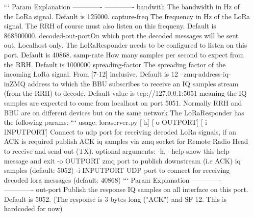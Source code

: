 {}``` \markdownRendererPipe{} Param \markdownRendererPipe{} Explanation \markdownRendererPipe{} \markdownRendererPipe{} ------------- \markdownRendererPipe{} ------------- \markdownRendererPipe{} \markdownRendererPipe{} bandwith \markdownRendererPipe{} The bandwidth in Hz of the LoRa signal. Default is 125000. \markdownRendererPipe{} \markdownRendererPipe{} capture-freq \markdownRendererPipe{} The frequency in Hz of the LoRa signal. The RRH of course must also listen on this frequeny. Default is 868500000. \markdownRendererPipe{} \markdownRendererPipe{}decoded-out-port\markdownRendererPipe{}On which port the decoded messages will be sent out. Localhost only. The LoRa\markdownRendererUnderscore{}Responder needs to be configured to listen on this port. Default is 40868.\markdownRendererPipe{} \markdownRendererPipe{}samp-rate\markdownRendererPipe{} How many samples per second to expect from the RRH. Default is 1000000\markdownRendererPipe{} \markdownRendererPipe{}spreading-factor\markdownRendererPipe{} The spreading factor of the incoming LoRa signal. From [7-12] inclusive. Default is 12 \markdownRendererPipe{} \markdownRendererPipe{}--zmq-address-iq-in\markdownRendererPipe{}ZMQ address to which the BBU subscribes to receive an IQ samples stream (from the RRH) to decode. Default value is tcp://127.0.0.1:5051 meaning the IQ samples are expected to come from localhost on port 5051. Normally RRH and BBU are on different devices but on the same network\markdownRendererPipe{}\markdownRendererInterblockSeparator
{}\markdownRendererHorizontalRule{}\markdownRendererInterblockSeparator
{}The LoRa\markdownRendererUnderscore{}Responder has the following params:\markdownRendererInterblockSeparator
{}``` usage: loraserver.py [-h] [-o OUT\markdownRendererUnderscore{}PORT] [-i INPUT\markdownRendererUnderscore{}PORT]\markdownRendererInterblockSeparator
{}Connect to udp port for receiving decoded LoRa signals, if an ACK is required publish ACK iq samples via zmq socket for Remote Radio Head to receive and send out (TX).\markdownRendererInterblockSeparator
{}optional arguments: -h, --help show this help message and exit -o OUTPORT zmq port to publish downstream (i.e ACK) iq samples (default: 5052) -i INPUTPORT UDP port to connect for receiving decoded lora messages (default: 40868)\markdownRendererInterblockSeparator
{}```\markdownRendererInterblockSeparator
{}\markdownRendererPipe{} Param \markdownRendererPipe{} Explanation \markdownRendererPipe{} \markdownRendererPipe{} ------------- \markdownRendererPipe{} ------------- \markdownRendererPipe{} \markdownRendererPipe{} out-port \markdownRendererPipe{} Publish the response IQ samples on all interface on this port. Default is 5052. (The response is 3 bytes long ("ACK") and SF 12. This is hardcoded for now)\markdownRendererPipe{}\markdownRendererInterblockSeparator
